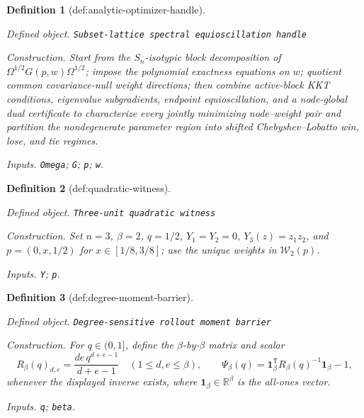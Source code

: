 \documentclass{article}
\newtheorem{definition}{Definition}
\begin{document}
\begin{definition}[def:analytic-optimizer-handle]\label{def:analytic-optimizer-handle}
\par\smallskip\noindent\emph{Defined object.} \texttt{Subset-\allowbreak{}lattice spectral equioscillation handle}
\par\smallskip\noindent\emph{Construction.} Start from the \(S_n\)-isotypic block decomposition of \(\Omega^{1/2}G(p,w)\Omega^{1/2}\); impose the polynomial exactness equations on \(w\); quotient common covariance-null weight directions; then combine active-block KKT conditions, eigenvalue subgradients, endpoint equioscillation, and a node-global dual certificate to characterize every jointly minimizing node--weight pair and partition the nondegenerate parameter region into shifted Chebyshev--Lobatto win, lose, and tie regimes.
\par\smallskip\noindent\emph{Inputs.} \texttt{Omega}; \texttt{G}; \texttt{p}; \texttt{w}.
\end{definition}

\begin{definition}[def:quadratic-witness]\label{def:quadratic-witness}
\par\smallskip\noindent\emph{Defined object.} \texttt{Three-\allowbreak{}unit quadratic witness}
\par\smallskip\noindent\emph{Construction.} Set \(n=3\), \(\beta=2\), \(q=1/2\), \(Y_1=Y_2=0\), \(Y_3(z)=z_1z_2\), and \(p=(0,x,1/2)\) for \(x\in[1/8,3/8]\); use the unique weights in \(\mathcal W_2(p)\).
\par\smallskip\noindent\emph{Inputs.} \texttt{Y}; \texttt{p}.
\end{definition}

\begin{definition}[def:degree-moment-barrier]\label{def:degree-moment-barrier}
\par\smallskip\noindent\emph{Defined object.} \texttt{Degree-\allowbreak{}sensitive rollout moment barrier}
\par\smallskip\noindent\emph{Construction.} For \(q\in(0,1]\), define the \(\beta\)-by-\(\beta\) matrix and scalar
\[
R_\beta(q)_{d,e}=\frac{de\,q^{d+e-1}}{d+e-1}
\quad(1\le d,e\le\beta),
\qquad
\Psi_\beta(q)=\mathbf 1_\beta^{\mathsf T}R_\beta(q)^{-1}\mathbf 1_\beta-1,
\]
whenever the displayed inverse exists, where \(\mathbf 1_\beta\in\mathbb R^\beta\) is the all-ones vector.
\par\smallskip\noindent\emph{Inputs.} \texttt{q}; \texttt{beta}.
\end{definition}
\end{document}
